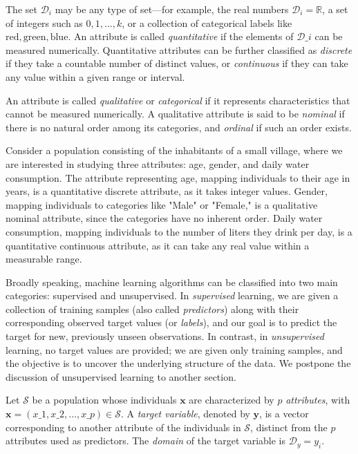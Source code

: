 The set $\mathcal{D}_i$ may be any type of set—for example, the real numbers $\mathcal{D}_{i} = \mathbb{R}$, a set of integers such as ${0, 1, \dots, k}$, or a collection of categorical labels like ${\text{red}, \text{green}, \text{blue}}$. An attribute is called \emph{quantitative} if the elements of $\mathcal{D}\_i$ can be measured numerically. Quantitative attributes can be further classified as \emph{discrete} if they take a countable number of distinct values, or \emph{continuous} if they can take any value within a given range or interval.

An attribute is called \emph{qualitative} or \emph{categorical} if it represents characteristics that cannot be measured numerically. A qualitative attribute is said to be \emph{nominal} if there is no natural order among its categories, and \emph{ordinal} if such an order exists.

\begin{example}
Consider a population consisting of the inhabitants of a small village, where we are interested in studying three attributes: age, gender, and daily water consumption. The attribute representing age, mapping individuals to their age in years, is a quantitative discrete attribute, as it takes integer values. Gender, mapping individuals to categories like "Male" or "Female," is a qualitative nominal attribute, since the categories have no inherent order. Daily water consumption, mapping individuals to the number of liters they drink per day, is a quantitative continuous attribute, as it can take any real value within a measurable range.
\end{example}

Broadly speaking, machine learning algorithms can be classified into two main categories: supervised and unsupervised. In \emph{supervised} learning, we are given a collection of training samples (also called \emph{predictors}) along with their corresponding observed target values (or \emph{labels}), and our goal is to predict the target for new, previously unseen observations. In contrast, in \emph{unsupervised} learning, no target values are provided; we are given only training samples, and the objective is to uncover the underlying structure of the data. We postpone the discussion of unsupervised learning to another section.

\begin{definition}
Let $\mathcal{S}$ be a population whose individuals $\mathbf{x}$ are characterized by $p$ \emph{attributes}, with $\mathbf{x} = (x\_{1}, x\_{2}, \dots, x\_{p}) \in \mathcal{S}$. A \emph{target variable}, denoted by $\mathbf{y}$, is a vector corresponding to another attribute of the individuals in $\mathcal{S}$, distinct from the $p$ attributes used as predictors. The \emph{domain} of the target variable is $\mathcal{D}_{y} = {y_{i}}$.
\end{definition}

